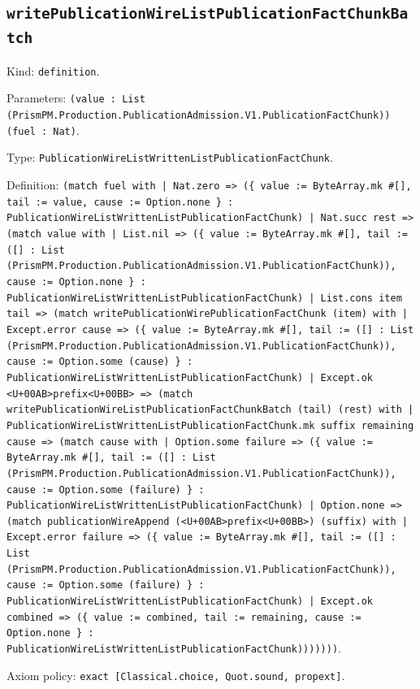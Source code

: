 \documentclass[11pt]{article}
\begin{document}
\subsection*{\texttt{writePublicationWireListPublicationFactChunkBatch}}
\noindent Kind: \texttt{definition}.\par
\noindent Parameters: \texttt{(value : List (PrismPM.Production.PublicationAdmission.V1.PublicationFactChunk)) (fuel : Nat)}.\par
\noindent Type: \texttt{PublicationWireListWrittenListPublicationFactChunk}.\par
\noindent Definition: \texttt{(match fuel with | Nat.zero => (\{ value := ByteArray.mk \#[], tail := value, cause := Option.none \} : PublicationWireListWrittenListPublicationFactChunk) | Nat.succ rest => (match value with | List.nil => (\{ value := ByteArray.mk \#[], tail := ([] : List (PrismPM.Production.PublicationAdmission.V1.PublicationFactChunk)), cause := Option.none \} : PublicationWireListWrittenListPublicationFactChunk) | List.cons item tail => (match writePublicationWirePublicationFactChunk (item) with | Except.error cause => (\{ value := ByteArray.mk \#[], tail := ([] : List (PrismPM.Production.PublicationAdmission.V1.PublicationFactChunk)), cause := Option.some (cause) \} : PublicationWireListWrittenListPublicationFactChunk) | Except.ok <U+00AB>prefix<U+00BB> => (match writePublicationWireListPublicationFactChunkBatch (tail) (rest) with | PublicationWireListWrittenListPublicationFactChunk.mk suffix remaining cause => (match cause with | Option.some failure => (\{ value := ByteArray.mk \#[], tail := ([] : List (PrismPM.Production.PublicationAdmission.V1.PublicationFactChunk)), cause := Option.some (failure) \} : PublicationWireListWrittenListPublicationFactChunk) | Option.none => (match publicationWireAppend (<U+00AB>prefix<U+00BB>) (suffix) with | Except.error failure => (\{ value := ByteArray.mk \#[], tail := ([] : List (PrismPM.Production.PublicationAdmission.V1.PublicationFactChunk)), cause := Option.some (failure) \} : PublicationWireListWrittenListPublicationFactChunk) | Except.ok combined => (\{ value := combined, tail := remaining, cause := Option.none \} : PublicationWireListWrittenListPublicationFactChunk)))))))}.\par
\noindent Axiom policy: \texttt{exact [Classical.choice, Quot.sound, propext]}.\par
\end{document}
